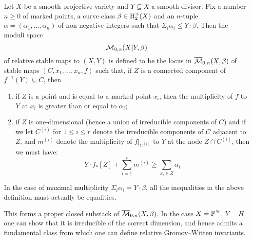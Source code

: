 \begin{definition} Let $X$ be a smooth projective variety and $Y \subseteq X$ a smooth divisor. Fix a number $n \geq 0$ of marked points, a curve class $\beta \in \operatorname{H}_2^+(X)$ and an $n$-tuple $\alpha = (\alpha_1, \ldots, \alpha_n)$ of non-negative integers such that $\Sigma_i \alpha_i \leq Y \cdot \beta$. Then the moduli space
\begin{equation*} \overline{\mathcal M}_{0,\alpha}(X|Y,\beta) \end{equation*}
of relative stable maps to $(X,Y)$ is defined to be the locus in $\overline{\mathcal M}_{0,n}(X,\beta)$ of stable maps $(C,x_1, \ldots, x_n, f)$ such that, if $Z$ is a connected component of $f^{-1}(Y) \subseteq C$, then
\begin{enumerate}
\item if $Z$ is a point and is equal to a marked point $x_i$, then the multiplicity of $f$ to $Y$ at $x_i$ is greater than or equal to $\alpha_i$;
\item if $Z$ is one-dimensional (hence a union of irreducible components of $C$) and if we let $C^{(i)}$ for $1 \leq i \leq r$ denote the irreducible components of $C$ adjacent to $Z$, and $m^{(i)}$ denote the multiplicity of $f|_{C^{(i)}}$ to $Y$ at the node $Z \cap C^{(i)}$, then we must have:
\begin{equation*} Y \cdot f_* [Z] + \sum_{i=1}^r m^{(i)} \geq \sum_{x_i \in Z} \alpha_i \end{equation*}
\end{enumerate}
\end{definition}
\begin{remark} In the case of maximal multiplicity $\Sigma_{i} \alpha_i = Y \cdot \beta$, all the inequalities in the above definition must actually be equalities. \end{remark}

This forms a proper closed substack of $\overline{\mathcal M}_{0,n}(X,\beta)$. In the case $X=\mathbb P^N$, $Y=H$ one can show that it is irreducible of the correct dimension, and hence admits a fundamental class from which one can define relative Gromov--Witten invariants.

